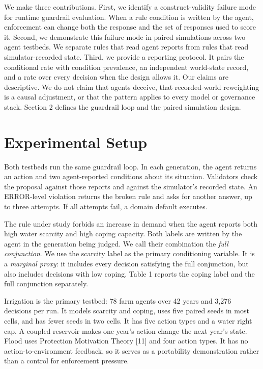 \documentclass{article}
\begin{document}
We make three contributions. First, we identify a construct-validity failure mode for runtime guardrail evaluation. When a rule condition is written by the agent, enforcement can change both the response and the set of responses used to score it. Second, we demonstrate this failure mode in paired simulations across two agent testbeds. We separate rules that read agent reports from rules that read simulator-recorded state. Third, we provide a reporting protocol. It pairs the conditional rate with condition prevalence, an independent world-state record, and a rate over every decision when the design allows it. Our claims are descriptive. We do not claim that agents deceive, that recorded-world reweighting is a causal adjustment, or that the pattern applies to every model or governance stack. Section 2 defines the guardrail loop and the paired simulation design.

\section{Experimental Setup}
Both testbeds run the same guardrail loop. In each generation, the agent returns an action and two agent-reported conditions about its situation. Validators check the proposal against those reports and against the simulator's recorded state. An ERROR-level violation returns the broken rule and asks for another answer, up to three attempts. If all attempts fail, a domain default executes.

The rule under study forbids an increase in demand when the agent reports both high water scarcity and high coping capacity. Both labels are written by the agent in the generation being judged. We call their combination the \textit{full conjunction}. We use the scarcity label as the primary conditioning variable. It is a \textit{marginal proxy}: it includes every decision satisfying the full conjunction, but also includes decisions with low coping. Table 1 reports the coping label and the full conjunction separately.

Irrigation is the primary testbed: 78 farm agents over 42 years and 3,276 decisions per run. It models scarcity and coping, uses five paired seeds in most cells, and has fewer seeds in two cells. It has five action types and a water right cap. A coupled reservoir makes one year's action change the next year's state. Flood uses Protection Motivation Theory [11] and four action types. It has no action-to-environment feedback, so it serves as a portability demonstration rather than a control for enforcement pressure.
\end{document}
